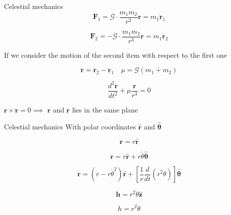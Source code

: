 \documentclass{beamer}
\begin{document}
\begin{frame}{Celestial mechanics}
\begin{equation}
\textbf{F}_{1}=\mathcal{G} \cdot \frac{m_{1}m_{2}}{r^{3}}\textbf{r}=m_{1} \ddot{\textbf{r}}_{1}
\end{equation}

\begin{equation}
\textbf{F}_{2}=-\mathcal{G} \cdot \frac{m_{1}m_{2}}{r^{3}}\textbf{r}=m_{1} \ddot{\textbf{r}}_{2}
\end{equation}
 
If we consider the motion of the second item with respect to the first one 
 
\begin{equation}
\ddot{\textbf{r}}=\ddot{\textbf{r}}_{2}-\ddot{\textbf{r}}_{1} \quad \mu=\mathcal{G}(m_{1}+m_{2})
\end{equation}

\begin{equation}
\dfrac{d^{2}\textbf{r}}{dt^{2}}+\mu\dfrac{\textbf{r}}{r^{3}}=0
\end{equation}

$\textbf{r} \times \ddot{ \textbf{r}}=0  \implies $ $\textbf{r}$  and $\dot{\textbf{r}}$ lies in the same plane

\end{frame}

\begin{frame}{Celestial mechanics}
With polar coordinates  $\hat{\textbf{r}}$ and $\hat{\boldsymbol{\theta}}$

\begin{equation}
\textbf{r}=r\hat{\textbf{r}}
\end{equation}

\begin{equation}
\dot{\textbf{r}}=\dot{r}\hat{\textbf{r}}+r\dot{\theta}\hat{\boldsymbol{\theta}}
\label{eq_dyn_nop}
\end{equation}

\begin{equation}
\ddot{\textbf{r}}=\left(\ddot{r}-r\dot{\theta}^{2}\right)\hat{\textbf{r}}+\left[\dfrac{1}{r}\frac{d}{dt}\left(r^{2}\dot{\theta}\right)\right]\hat{\boldsymbol{\theta}}
\end{equation}

\begin{equation}
\textbf{h}=r^{2}\dot{\theta}\hat{\textbf{z}}
\end{equation}


\begin{equation}
h=r^{2}\dot{\theta}
\end{equation}

\end{frame}
\end{document}
